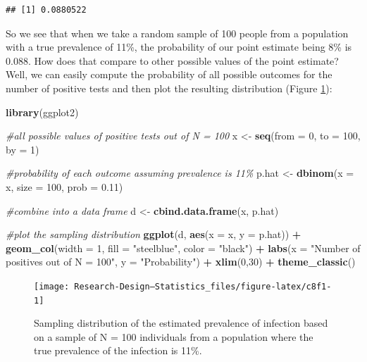 \documentclass[
]{book}
\newenvironment{Shaded}{\begin{snugshade}}{\end{snugshade}}
\newcommand{\AttributeTok}[1]{\textcolor[rgb]{0.13,0.29,0.53}{#1}}
\newcommand{\CommentTok}[1]{\textcolor[rgb]{0.56,0.35,0.01}{\textit{#1}}}
\newcommand{\DecValTok}[1]{\textcolor[rgb]{0.00,0.00,0.81}{#1}}
\newcommand{\FloatTok}[1]{\textcolor[rgb]{0.00,0.00,0.81}{#1}}
\newcommand{\FunctionTok}[1]{\textcolor[rgb]{0.13,0.29,0.53}{\textbf{#1}}}
\newcommand{\NormalTok}[1]{#1}
\newcommand{\OtherTok}[1]{\textcolor[rgb]{0.56,0.35,0.01}{#1}}
\newcommand{\SpecialCharTok}[1]{\textcolor[rgb]{0.81,0.36,0.00}{\textbf{#1}}}
\newcommand{\StringTok}[1]{\textcolor[rgb]{0.31,0.60,0.02}{#1}}
\begin{document}
\begin{verbatim}
## [1] 0.0880522
\end{verbatim}

So we see that when we take a random sample of 100 people from a population with a true prevalence of 11\%, the probability of our point estimate being 8\% is 0.088. How does that compare to other possible values of the point estimate? Well, we can easily compute the probability of all possible outcomes for the number of positive tests and then plot the resulting distribution (Figure \ref{fig:c8f1}):

\begin{Shaded}
\begin{Highlighting}[]
\FunctionTok{library}\NormalTok{(ggplot2)}

\CommentTok{\#all possible values of positive tests out of N = 100}
\NormalTok{x }\OtherTok{\textless{}{-}} \FunctionTok{seq}\NormalTok{(}\AttributeTok{from =} \DecValTok{0}\NormalTok{, }\AttributeTok{to =} \DecValTok{100}\NormalTok{, }\AttributeTok{by =} \DecValTok{1}\NormalTok{)}

\CommentTok{\#probability of each outcome assuming prevalence is 11\%}
\NormalTok{p.hat }\OtherTok{\textless{}{-}} \FunctionTok{dbinom}\NormalTok{(}\AttributeTok{x =}\NormalTok{ x, }\AttributeTok{size =} \DecValTok{100}\NormalTok{, }\AttributeTok{prob =} \FloatTok{0.11}\NormalTok{)}

\CommentTok{\#combine into a data frame}
\NormalTok{d }\OtherTok{\textless{}{-}} \FunctionTok{cbind.data.frame}\NormalTok{(x, p.hat)}

\CommentTok{\#plot the sampling distribution}
\FunctionTok{ggplot}\NormalTok{(d, }\FunctionTok{aes}\NormalTok{(}\AttributeTok{x =}\NormalTok{ x, }\AttributeTok{y =}\NormalTok{ p.hat)) }\SpecialCharTok{+}
  \FunctionTok{geom\_col}\NormalTok{(}\AttributeTok{width =} \DecValTok{1}\NormalTok{, }\AttributeTok{fill =} \StringTok{"steelblue"}\NormalTok{, }\AttributeTok{color =} \StringTok{"black"}\NormalTok{) }\SpecialCharTok{+} 
  \FunctionTok{labs}\NormalTok{(}\AttributeTok{x =} \StringTok{"Number of positives out of N = 100"}\NormalTok{, }\AttributeTok{y =} \StringTok{"Probability"}\NormalTok{) }\SpecialCharTok{+}
  \FunctionTok{xlim}\NormalTok{(}\DecValTok{0}\NormalTok{,}\DecValTok{30}\NormalTok{) }\SpecialCharTok{+}
  \FunctionTok{theme\_classic}\NormalTok{()}
\end{Highlighting}
\end{Shaded}

\begin{figure}

{\centering \texttt{[image: Research-Design---Statistics\_files/figure-latex/c8f1-1]} 

}

\caption{Sampling distribution of the estimated prevalence of infection based on a sample of N = 100 individuals from a population where the true prevalence of the infection is 11\%.}\label{fig:c8f1}
\end{figure}
\end{document}
